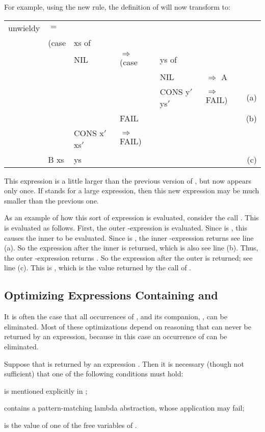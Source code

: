For example, using the new rule, the definition of  will now  transform to:
\begin{mlcoded}
\setlength{\tabcolsep}{0.15em}
\begin{tabular}{llllllr}
unwieldy &$=$ \tlb{xs&}\tlb{ys} &&&&\\
    &(case &xs of&&&& \\
        &&NIL  & $\Rightarrow$ (case& ys of &&\\
        &&&&NIL & $\Rightarrow$ A & \\
        &&&&CONS y$'$ ys$'$  &$\Rightarrow$ FAIL) &(a) \\
    &&& \phantom{$\Rightarrow$ }\fatbar{} FAIL&& &(b) \\
    &&CONS x$'$ xs$'$ &$\Rightarrow$ FAIL)&&& \\
    &\fatbar{} B xs &ys &&&&(c) \\
\end{tabular}
\end{mlcoded}
This expression is a little larger than the previous version of , but now  appears only once. If  stands for a large expression, then this new expression may be much smaller than the previous one.

As an example of how this sort of expression is evaluated, consider the call . This is evaluated as follows. First, the outer -expression is evaluated. Since  is , this causes the inner  to be evaluated. Since  is , the inner -expression returns  see line (a). So the expression after the inner \ml{\fatbar{}} is returned, which is also  see line (b). Thus, the outer -expression returns . So the expression after the outer \ml{\fatbar{}} is returned; see line (c). This is , which is the value returned by the call of .

\subsection{Optimizing Expressions Containing \ml{\fatbar{}} and }
It is often the case that all occurrences of , and its companion, \ml{\fatbar{}}, can be eliminated. Most of these optimizations depend on reasoning that  can never be returned by an expression, because in this case an occurrence of \ml{\fatbar{}} can be eliminated.

Suppose that  is returned by an expression . Then it is necessary (though not sufficient) that one of the following conditions must hold:
\begin{numbered}
    \item {} is mentioned explicitly in ;
    \item {} contains a pattern-matching lambda abstraction, whose application may fail;
    \item {} is the value of one of the free variables of .
\end{numbered}

